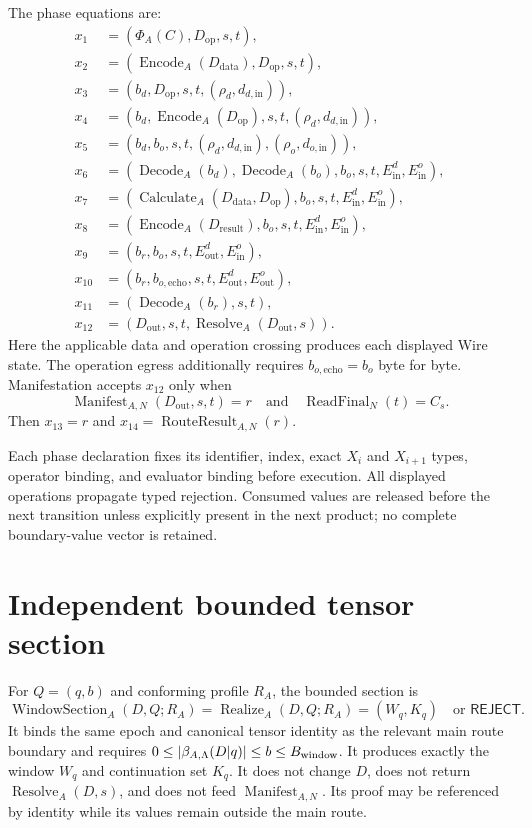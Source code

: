 \documentclass[11pt,letterpaper]{article}
\newcommand{\Reject}{\mathsf{REJECT}}
\newcommand{\Enc}{\operatorname{Encode}}
\newcommand{\Dec}{\operatorname{Decode}}
\newcommand{\Calc}{\operatorname{Calculate}}
\newcommand{\Resolve}{\operatorname{Resolve}}
\newcommand{\Manifest}{\operatorname{Manifest}}
\theoremstyle{definition}
\begin{document}
The phase equations are:
\begin{align}
x_1&=(\Phi_A(C),D_{\mathrm{op}},s,t),\\
x_2&=(\Enc_A(D_{\mathrm{data}}),D_{\mathrm{op}},s,t),\\
x_3&=(b_d,D_{\mathrm{op}},s,t,(\rho_d,d_{d,\mathrm{in}})),\\
x_4&=(b_d,\Enc_A(D_{\mathrm{op}}),s,t,(\rho_d,d_{d,\mathrm{in}})),\\
x_5&=(b_d,b_o,s,t,(\rho_d,d_{d,\mathrm{in}}),(\rho_o,d_{o,\mathrm{in}})),\\
x_6&=(\Dec_A(b_d),\Dec_A(b_o),b_o,s,t,E^d_{\mathrm{in}},E^o_{\mathrm{in}}),\\
x_7&=(\Calc_A(D_{\mathrm{data}},D_{\mathrm{op}}),b_o,s,t,E^d_{\mathrm{in}},E^o_{\mathrm{in}}),\\
x_8&=(\Enc_A(D_{\mathrm{result}}),b_o,s,t,E^d_{\mathrm{in}},E^o_{\mathrm{in}}),\\
x_9&=(b_r,b_o,s,t,E^d_{\mathrm{out}},E^o_{\mathrm{in}}),\\
x_{10}&=(b_r,b_{o,\mathrm{echo}},s,t,E^d_{\mathrm{out}},E^o_{\mathrm{out}}),\\
x_{11}&=(\Dec_A(b_r),s,t),\\
x_{12}&=(D_{\mathrm{out}},s,t,\Resolve_A(D_{\mathrm{out}},s)).
\end{align}
Here the applicable data and operation crossing produces each displayed Wire
state.  The operation egress additionally requires
$b_{o,\mathrm{echo}}=b_o$ byte for byte.  Manifestation accepts $x_{12}$ only when
\begin{equation}
\Manifest_{A,N}(D_{\mathrm{out}},s,t)=r
\quad\text{and}\quad
\operatorname{ReadFinal}_N(t)=C_s.\label{eq:manifest}
\end{equation}
Then $x_{13}=r$ and $x_{14}=\operatorname{RouteResult}_{A,N}(r)$.

Each phase declaration fixes its identifier, index, exact $X_i$ and
$X_{i+1}$ types, operator binding, and evaluator binding before execution.
All displayed operations propagate typed rejection.  Consumed values are
released before the next transition unless explicitly present in the next
product; no complete boundary-value vector is retained.

\section{Independent bounded tensor section}

For $Q=(q,b)$ and conforming profile $R_A$, the bounded section is
\[
\operatorname{WindowSection}_A(D,Q;R_A)
=\operatorname{Realize}_A(D,Q;R_A)=(W_q,K_q)\quad\text{or }\Reject.
\]
It binds the same epoch and canonical tensor identity as the relevant main
route boundary and requires
$0\le|\beta_{A,\Lambda}(D|q)|\le b\le B_{\rm window}$.  It produces exactly
the window $W_q$ and continuation set $K_q$.  It does not change $D$, does not
return $\Resolve_A(D,s)$, and does not feed $\Manifest_{A,N}$.  Its proof may
be referenced by identity while its values remain outside the main route.
\end{document}
